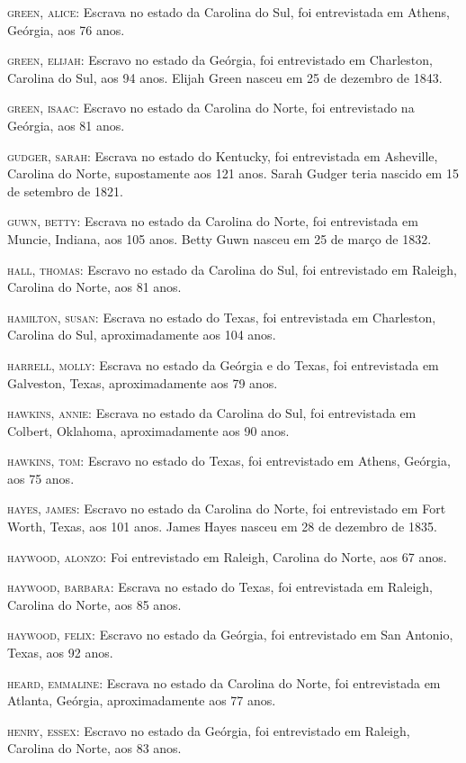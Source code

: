 \begin{Parskip}
\textsc{green, alice:} Escrava no estado da Carolina do Sul, foi
entrevistada em Athens, Geórgia, aos 76 anos.

\textsc{green, elijah:} Escravo no estado da Geórgia, foi entrevistado
em Charleston, Carolina do Sul, aos 94 anos. Elijah Green nasceu em 25
de dezembro de 1843.

\textsc{green, isaac:} Escravo no estado da Carolina do Norte, foi
entrevistado na Geórgia, aos 81 anos.

\textsc{gudger, sarah:} Escrava no estado do Kentucky, foi entrevistada
em Asheville, Carolina do Norte, supostamente aos 121 anos. Sarah Gudger
teria nascido em 15 de setembro de 1821.

\textsc{guwn, betty:} Escrava no estado da Carolina do Norte, foi
entrevistada em Muncie, Indiana, aos 105 anos. Betty Guwn nasceu em 25
de março de 1832.

\textsc{hall, thomas:} Escravo no estado da Carolina do Sul, foi
entrevistado em Raleigh, Carolina do Norte, aos 81 anos.

\textsc{hamilton, susan:} Escrava no estado do Texas, foi entrevistada
em Charleston, Carolina do Sul, aproximadamente aos 104 anos.

\textsc{harrell, molly:} Escrava no estado da Geórgia e do Texas, foi
entrevistada em Galveston, Texas, aproximadamente aos 79 anos.

\textsc{hawkins, annie:} Escrava no estado da Carolina do Sul, foi
entrevistada em Colbert, Oklahoma, aproximadamente aos 90 anos.

\textsc{hawkins, tom:} Escravo no estado do Texas, foi entrevistado em
Athens, Geórgia, aos 75 anos.

\textsc{hayes, james:} Escravo no estado da Carolina do Norte, foi
entrevistado em Fort Worth, Texas, aos 101 anos. James Hayes nasceu em
28 de dezembro de 1835.

\textsc{haywood, alonzo:} Foi entrevistado em Raleigh, Carolina do
Norte, aos 67 anos.

\textsc{haywood, barbara:} Escrava no estado do Texas, foi entrevistada
em Raleigh, Carolina do Norte, aos 85 anos.

\textsc{haywood, felix:} Escravo no estado da Geórgia, foi entrevistado
em San Antonio, Texas, aos 92 anos.

\textsc{heard, emmaline:} Escrava no estado da Carolina do Norte, foi
entrevistada em Atlanta, Geórgia, aproximadamente aos 77 anos.

\textsc{henry, essex:} Escravo no estado da Geórgia, foi entrevistado em
Raleigh, Carolina do Norte, aos 83 anos.


\end{Parskip}
